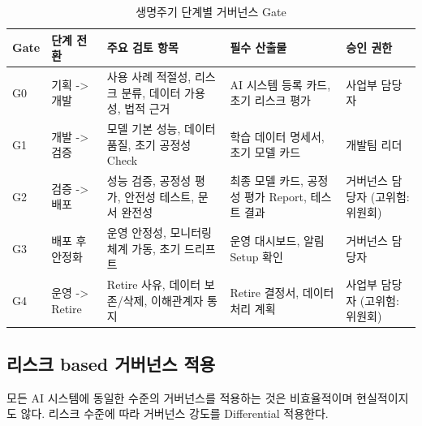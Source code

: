 \begin{table}[htbp]
\centering
\caption{생명주기 단계별 거버넌스 Gate}
\label{tab:governance_gates}
\begin{tabularx}{\textwidth}{p{1cm}p{2cm}p{4cm}p{3cm}X}
\toprule
\textbf{Gate} & \textbf{단계 전환} & \textbf{주요 검토 항목} & \textbf{필수 산출물} & \textbf{승인 권한} \\
\midrule
G0 & 
기획 -> 개발 & 
사용 사례 적절성, 리스크 분류, 데이터 가용성, 법적 근거 &
AI 시스템 등록 카드, 초기 리스크 평가 & 
사업부 담당자 \\
\midrule
G1 & 
개발 -> 검증 & 
모델 기본 성능, 데이터 품질, 초기 공정성 Check & 
학습 데이터 명세서, 초기 모델 카드\cite{mitchell2019model} & 
개발팀 리더 \\
\midrule
G2 & 
검증 -> 배포 & 
성능 검증, 공정성 평가, 안전성 테스트, 문서 완전성 & 
최종 모델 카드, 공정성 평가 Report, 테스트 결과 & 
거버넌스 담당자 (고위험: 위원회) \\
\midrule
G3 & 
배포 후 안정화 & 
운영 안정성, 모니터링 체계 가동, 초기 드리프트 & 
운영 대시보드, 알림 Setup 확인 & 
거버넌스 담당자 \\
\midrule
G4 & 
운영 -> Retire & 
Retire 사유, 데이터 보존/삭제, 이해관계자 통지 & 
Retire 결정서, 데이터 처리 계획 & 
사업부 담당자 (고위험: 위원회) \\
\bottomrule
\end{tabularx}
\end{table}


\subsection{리스크 based 거버넌스 적용}
\label{sec:4.3.2}

모든 AI 시스템에 동일한 수준의 거버넌스를 적용하는 것은 
비효율적이며 현실적이지도 않다. 
리스크 수준에 따라 거버넌스 강도를 Differential 적용한다.

